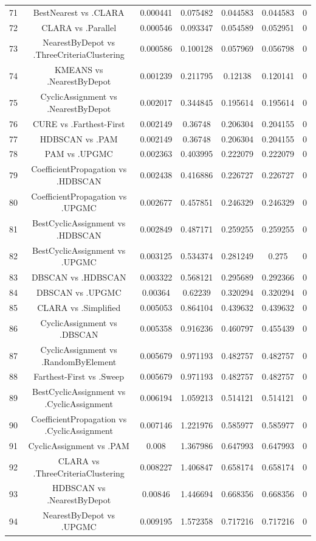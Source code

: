 \documentclass[a4paper,10pt]{article}
\begin{document}
\begin{landscape}
\begin{table}[!htp]
\begin{tabular}{ccccccc}
71&BestNearest vs .CLARA&0.000441&0.075482&0.044583&0.044583&0\\
72&CLARA vs .Parallel&0.000546&0.093347&0.054589&0.052951&0\\
73&NearestByDepot vs .ThreeCriteriaClustering&0.000586&0.100128&0.057969&0.056798&0\\
74&KMEANS vs .NearestByDepot&0.001239&0.211795&0.12138&0.120141&0\\
75&CyclicAssignment vs .NearestByDepot&0.002017&0.344845&0.195614&0.195614&0\\
76&CURE vs .Farthest-First&0.002149&0.36748&0.206304&0.204155&0\\
77&HDBSCAN vs .PAM&0.002149&0.36748&0.206304&0.204155&0\\
78&PAM vs .UPGMC&0.002363&0.403995&0.222079&0.222079&0\\
79&CoefficientPropagation vs .HDBSCAN&0.002438&0.416886&0.226727&0.226727&0\\
80&CoefficientPropagation vs .UPGMC&0.002677&0.457851&0.246329&0.246329&0\\
81&BestCyclicAssignment vs .HDBSCAN&0.002849&0.487171&0.259255&0.259255&0\\
82&BestCyclicAssignment vs .UPGMC&0.003125&0.534374&0.281249&0.275&0\\
83&DBSCAN vs .HDBSCAN&0.003322&0.568121&0.295689&0.292366&0\\
84&DBSCAN vs .UPGMC&0.00364&0.62239&0.320294&0.320294&0\\
85&CLARA vs .Simplified&0.005053&0.864104&0.439632&0.439632&0\\
86&CyclicAssignment vs .DBSCAN&0.005358&0.916236&0.460797&0.455439&0\\
87&CyclicAssignment vs .RandomByElement&0.005679&0.971193&0.482757&0.482757&0\\
88&Farthest-First vs .Sweep&0.005679&0.971193&0.482757&0.482757&0\\
89&BestCyclicAssignment vs .CyclicAssignment&0.006194&1.059213&0.514121&0.514121&0\\
90&CoefficientPropagation vs .CyclicAssignment&0.007146&1.221976&0.585977&0.585977&0\\
91&CyclicAssignment vs .PAM&0.008&1.367986&0.647993&0.647993&0\\
92&CLARA vs .ThreeCriteriaClustering&0.008227&1.406847&0.658174&0.658174&0\\
93&HDBSCAN vs .NearestByDepot&0.00846&1.446694&0.668356&0.668356&0\\
94&NearestByDepot vs .UPGMC&0.009195&1.572358&0.717216&0.717216&0\\

\end{tabular}
\end{table}
\end{landscape}
\end{document}

